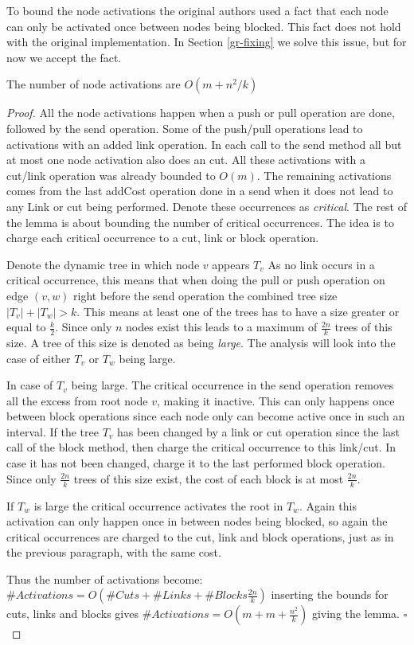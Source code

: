 To bound the node activations the original authors used a fact that each node can only be activated once between nodes being blocked. This fact does not
hold with the original implementation. In Section \ref{gr-fixing} we solve this issue, but for now we accept the fact.
	
\begin{lemma} \label{BF-NodeActivations}
	The number of node activations are $O(m+ n^2/k)$
\end{lemma}
\begin{proof}
	All the node activations happen when a push or pull operation are done, followed by the send operation. Some of the push/pull operations lead
	to activations with an added link operation. In each call to the send method all but at most one node activation also does an cut. All these
	activations with a cut/link operation was already bounded to $O(m)$. The remaining activations comes from the last addCost operation done in a send
	when it does not lead to any Link or cut being performed. Denote these occurrences as \emph{critical}. The rest of the lemma is about bounding the number
	of critical occurrences. The idea is to charge each critical occurrence to a cut, link or block operation.
	
	Denote the dynamic tree in which node $v$ appears $T_v$
	As no link occurs in a critical occurrence, this means that when doing the pull or push operation on edge $(v,w)$ right before the send operation 
	the combined tree size $|T_v|+|T_w| > k$. This means at least one of the trees has to have a size greater or equal to $\frac{k}{2}$. Since only 
	$n$ nodes exist this leads to a maximum of $\frac{2n}{k}$ trees of this size. A tree of this size is denoted as being \emph{large}. The analysis will look
	into the case of either $T_v$ or $T_w$ being large. 
	
	In case of $T_v$ being large. The critical occurrence in the send operation removes all the excess from root node $v$, making it inactive.
	This can only happens once between block operations since each node only can become active once in such an interval. If the tree
	$T_v$ has been changed by a link or cut operation since the last call of the block method, then charge the critical occurrence to this link/cut.
	In case it has not been changed, charge it to the last performed block operation. Since only $\frac{2n}{k}$ trees of this size exist,
	the cost of each block is at most $\frac{2n}{k}$.
	
	If $T_w$ is large the critical occurrence activates the root in $T_w$. Again this activation can only happen once in between nodes being blocked,
	so again the critical occurrences are charged to the cut, link and block operations, just as in the previous paragraph, with the same cost.
	
	Thus the number of activations become: $\#Activations = O(\#Cuts + \#Links + \#Blocks \frac{2n}{k})$ inserting the bounds for cuts, links and blocks
	gives $\#Activations = O(m + m + \frac{n^2}{k})$ giving the lemma. $\square$
\end{proof}

